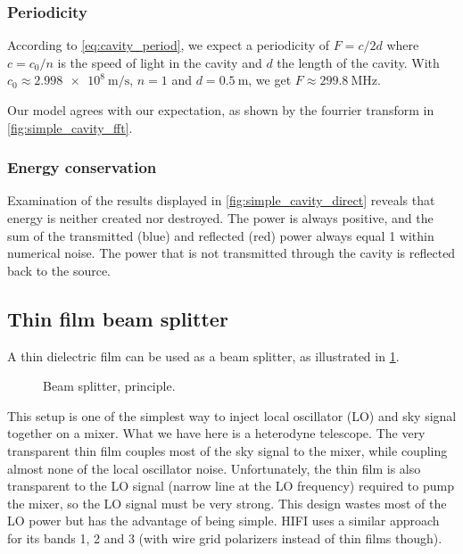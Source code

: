 
\subsubsection{Periodicity}
According to \cref{eq:cavity_period}, we expect a periodicity of $F=c/2d$ where $c=c_0/n$ is the speed of light in the cavity and $d$ the length of the cavity.
With $c_0\approx \SI{2.998e8}{\meter\per\second}$, $n=1$ and $d=\SI{0.5}{\meter}$, we get $F \approx \SI{299.8}{\mega\hertz}$.

Our model agrees with our expectation, as shown by the fourrier transform in \cref{fig:simple_cavity_fft}.




\subsubsection{Energy conservation}
Examination of the results displayed in \cref{fig:simple_cavity_direct} reveals that energy is neither created nor destroyed.
The power is always positive, and the sum of the transmitted (blue) and reflected (red) power always equal 1 within numerical noise.
The power that is not transmitted through the cavity is reflected back to the source.




\subsection{Thin film beam splitter}

A thin dielectric film can be used as a beam splitter, as illustrated in \cref{fig:beam_splitter_principle}.
\begin{figure}[hbtp]
    \centering
    
    \caption{Beam splitter, principle.}
    \label{fig:beam_splitter_principle}
\end{figure}

This setup is one of the simplest way to inject local oscillator (LO) and sky signal together on a mixer.
What we have here is a heterodyne telescope.
The very transparent thin film couples most of the sky signal to the mixer, while coupling almost none of the local oscillator noise.
Unfortunately, the thin film is also transparent to the LO signal (narrow line at the LO frequency) required to pump the mixer, so the LO signal must be very strong.
This design wastes most of the LO power but has the advantage of being simple.
HIFI uses a similar approach for its bands 1, 2 and 3 (with wire grid polarizers instead of thin films though).

